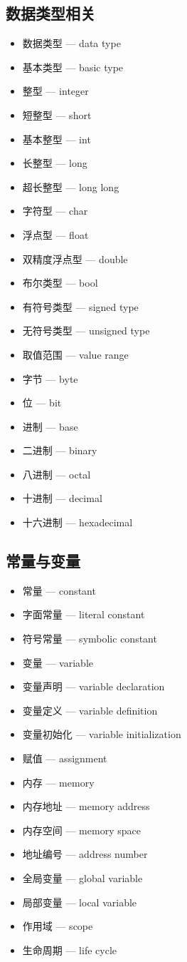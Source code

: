 \subsection{数据类型相关}
\begin{itemize}
\item 数据类型 — data type
\item 基本类型 — basic type
\item 整型 — integer
\item 短整型 — short
\item 基本整型 — int
\item 长整型 — long
\item 超长整型 — long long
\item 字符型 — char
\item 浮点型 — float
\item 双精度浮点型 — double
\item 布尔类型 — bool
\item 有符号类型 — signed type
\item 无符号类型 — unsigned type
\item 取值范围 — value range
\item 字节 — byte
\item 位 — bit
\item 进制 — base
\item 二进制 — binary
\item 八进制 — octal
\item 十进制 — decimal
\item 十六进制 — hexadecimal
\end{itemize}

\subsection{常量与变量}
\begin{itemize}
\item 常量 — constant
\item 字面常量 — literal constant
\item 符号常量 — symbolic constant
\item 变量 — variable
\item 变量声明 — variable declaration
\item 变量定义 — variable definition
\item 变量初始化 — variable initialization
\item 赋值 — assignment
\item 内存 — memory
\item 内存地址 — memory address
\item 内存空间 — memory space
\item 地址编号 — address number
\item 全局变量 — global variable
\item 局部变量 — local variable
\item 作用域 — scope
\item 生命周期 — life cycle
\end{itemize}

